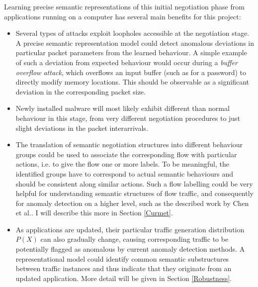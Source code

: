 \documentclass[a4paper,12pt,twoside]{report}
\begin{document}



Learning precise semantic representations of this initial negotiation phase from applications running on a computer has several main benefits for this project: 

\begin{itemize}
\item Several types of attacks exploit loopholes accessible at the negotiation stage. A precise semantic representation model could detect anomalous deviations in particular packet parameters from the learned behaviour. A simple example of such a deviation from expected behaviour would occur during a \textit{buffer overflow attack}, which overflows an input buffer (such as for a password) to directly modify memory locations. This should be observable as a significant deviation in the corresponding packet size.

\item Newly installed malware will most likely exhibit different than normal behaviour in this stage, from very different negotiation procedures to just slight deviations in the packet interarrivals.

\item The translation of semantic negotiation structures into different behaviour groups could be used to associate the corresponding flow with particular actions, i.e. to give the flow one or more labels. To be meaningful, the identified groups have to correspond to actual semantic behaviours and should be consistent along similar actions. 
Such a flow labelling could be very helpful for understanding semantic structures of flow traffic, and consequently for anomaly detection on a higher level, such as the described work by Chen et al.\cite{chen_more_2016}. I will describe this more in Section \ref{Curmet}.

\item As applications are updated, their particular traffic generation distribution $P(X)$ can also  gradually change, causing corresponding traffic to be potentially flagged as anomalous by current anomaly detection methods. A representational model could identify common semantic substructures between traffic instances and thus indicate that they originate from an updated application. More detail will be given in Section \ref{Robustness}.

\end{itemize}
\end{document}
